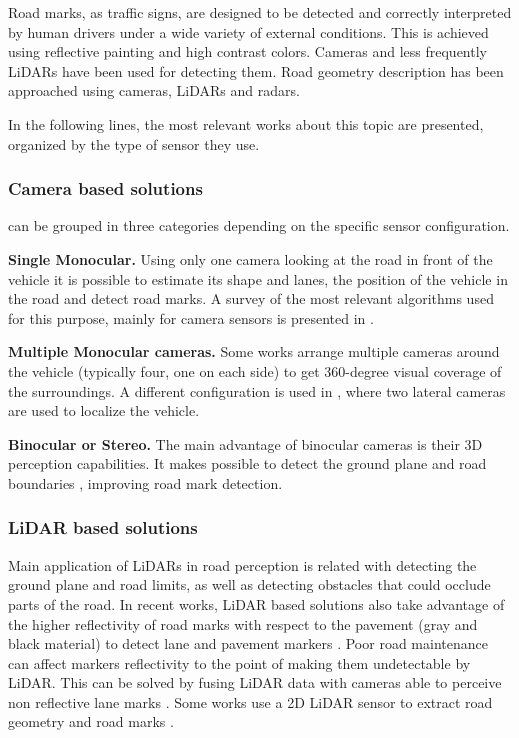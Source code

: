 Road marks, as traffic signs, are designed to be detected and 
correctly interpreted by human drivers under a wide variety of external 
conditions. This is achieved using reflective painting and high contrast 
colors. Cameras and less frequently LiDARs have been used for detecting them.
Road geometry description has been approached using cameras, LiDARs and radars.

In the following lines, the most relevant works about this topic are presented, 
organized by the type of sensor they use.


\subsubsection{Camera based solutions}
can be grouped in three categories depending on the specific sensor 
configuration.

\textbf{Single Monocular.}
Using only one 
camera looking at the road in front of the vehicle it is possible to estimate 
its shape and lanes, the position of the vehicle in the road and  
detect road marks. A survey of the most 
relevant algorithms used for this purpose, mainly for camera sensors is 
presented in \cite{hillel2014recent}.

\textbf{Multiple Monocular cameras.} 
Some works \cite{lee2017avm, kum2013lane} arrange multiple cameras 
around the vehicle (typically four, one on each side) to get 360-degree 
visual coverage of the surroundings. 
A different configuration is used in \cite{Ieng2003}, where two lateral cameras
are used to localize the vehicle. 

\textbf{Binocular or Stereo.} 
The main advantage of binocular cameras is their 3D perception capabilities.
It makes possible to detect the ground plane and road boundaries 
\cite{schreiber2013laneloc, ozgunalp2017multiple}, improving road mark 
detection. 

\subsubsection{LiDAR based solutions}
Main application of LiDARs in road perception is related with detecting the 
ground plane and road limits, as well as detecting obstacles that could occlude 
parts of the road.
In recent works, LiDAR based solutions also take advantage of the higher 
reflectivity of road marks with respect to the pavement (gray and black 
material) to detect lane \cite{yang2012automated, li2013new} and
pavement markers \cite{Zhang2016}.
Poor road maintenance can affect markers reflectivity to the point of making 
them undetectable by LiDAR. This can be solved by fusing LiDAR 
data with cameras able to perceive non reflective lane marks \cite{lee2017avm}.
Some works use a 2D LiDAR sensor to extract road geometry and road marks 
\cite{nie2012camera, kim2015lane}.

